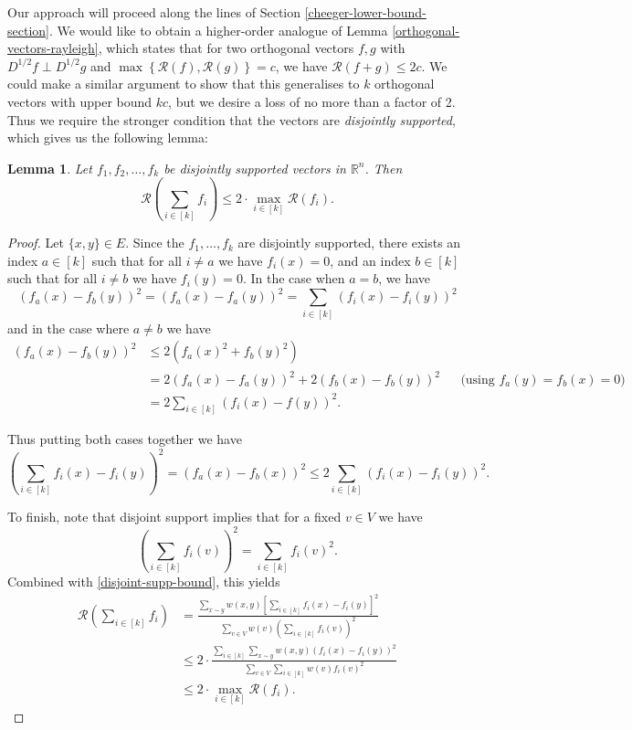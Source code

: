 \documentclass[a4paper,11pt]{article}
\newtheorem{lemma}[theorem]{Lemma}
\theoremstyle{definition}
\newcommand{\R}{\mathbb{R}}
\newcommand{\rayleigh}[1]{\mathcal{R}\left(#1\right)}
\begin{document}
Our approach will proceed along the lines of Section \ref{cheeger-lower-bound-section}. We would like to obtain a higher-order analogue of Lemma \ref{orthogonal-vectors-rayleigh}, which states that for two orthogonal vectors $f, g$ with $D^{1/2}f \perp D^{1/2}g$ and $\max \left\{\rayleigh{f}, \rayleigh{g}\right\} = c$, we have $\rayleigh{f + g} \le 2c$. We could make a similar argument to show that this generalises to $k$ orthogonal vectors with upper bound $kc$, but we desire a loss of no more than a factor of 2. Thus we require the stronger condition that the vectors are \emph{disjointly supported}, which gives us the following lemma:

\begin{lemma}\label{disjoint-supp-vectors-rayleigh}
Let $f_1, f_2, \dots, f_k$ be disjointly supported vectors in $\R^n$. Then
\[
\rayleigh{\sum_{i \in [k]} f_i} \le 2 \cdot \max_{i \in [k]} \rayleigh{f_i}.
\]
\end{lemma}
\begin{proof}
Let $\{x, y\} \in E$. Since the $f_1, \dots, f_k$ are disjointly supported, there exists an index $a \in [k]$ such that for all $i \ne a$ we have $f_i(x) = 0$, and an index $b \in [k]$ such that for all $i \ne b$ we have $f_i(y) = 0$. In the case when $a = b$, we have
\[
(f_a(x) - f_b(y))^2 = (f_a(x) - f_a(y))^2 = \sum_{i \in [k]} (f_i(x) - f_i(y))^2
\]
and in the case where $a \ne b$ we have
\begin{align*}
(f_a(x) - f_b(y))^2
&\le 2(f_a(x)^2 + f_b(y)^2) \\
&= 2(f_a(x) - f_a(y))^2 + 2(f_b(x) - f_b(y))^2 && \text {(using } f_a(y) = f_b(x) = 0\mathrm{)} \\
&= 2\sum_{i \in [k]}(f_i(x) - f(y))^2.
\end{align*}

Thus putting both cases together we have
\begin{equation}\label{disjoint-supp-bound}
\left(\sum_{i \in [k]} f_i(x) - f_i(y)\right)^2 = (f_a(x) - f_b(x))^2 \le 2 \sum_{i \in [k]} (f_i(x) - f_i(y))^2.
\end{equation}

To finish, note that disjoint support implies that for a fixed $v \in V$ we have
\[
\left(\sum_{i \in [k]} f_i(v)\right)^2 = \sum_{i \in [k]} f_i(v)^2.
\] Combined with \eqref{disjoint-supp-bound}, this yields
\begin{align*}
\rayleigh{\sum_{i \in [k]} f_i}
&= \frac{\sum_{x \sim y} w(x, y) \left[\sum_{i \in [k]} f_i(x) - f_i(y)\right]^2}{\sum\limits_{v \in V} w(v) \left(\sum_{i \in [k]} f_i(v) \right)^2} \\
&\le 2 \cdot \frac{\sum_{i \in [k]} \sum_{x \sim y} w(x, y) (f_i(x) - f_i(y))^2}{\sum\limits_{v \in V} \sum\limits_{i \in [k]} w(v) f_i(v)^2} \\
&\le 2 \cdot \max_{i \in [k]} \rayleigh{f_i}.
\end{align*}

\end{proof}
\end{document}
